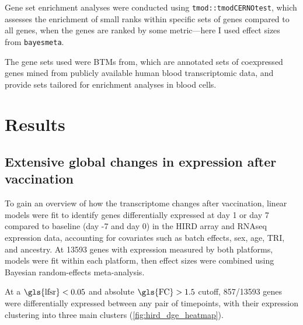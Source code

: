 Gene set enrichment analyses were conducted using \texttt{tmod::tmodCERNOtest}\autocite{weiner3rd2016TmodPackageGeneral}, which assesses the enrichment of small ranks within specific sets of genes compared to all genes, when the genes are ranked by some metric---here I used effect sizes from \texttt{bayesmeta}.

The gene sets used were \glspl{BTM} from\autocite{li2013MolecularSignaturesAntibody}, which are annotated sets of coexpressed genes mined from publicly available human blood transcriptomic data, and provide sets tailored for enrichment analyses in blood cells.

\section{Results}

\subsection{Extensive global changes in expression after vaccination}

To gain an overview of how the transcriptome changes after vaccination, linear models were fit to identify genes differentially expressed at day 1 or day 7 compared to baseline (day -7 and day 0) in the \gls{HIRD} array and \gls{RNAseq} expression data, accounting for covariates such as batch effects, sex, age, \gls{TRI}, and ancestry.
At 13593 genes with expression measured by both platforms, models were fit within each platform, then effect sizes were combined using Bayesian random-effects meta-analysis.

At a $\text{\gls{lfsr}} < 0.05$ and absolute $\text{\gls{FC}} > 1.5$ cutoff, 857/13593 genes were differentially expressed between any pair of timepoints, with their expression clustering into three main clusters (\autoref{fig:hird_dge_heatmap}).
 
